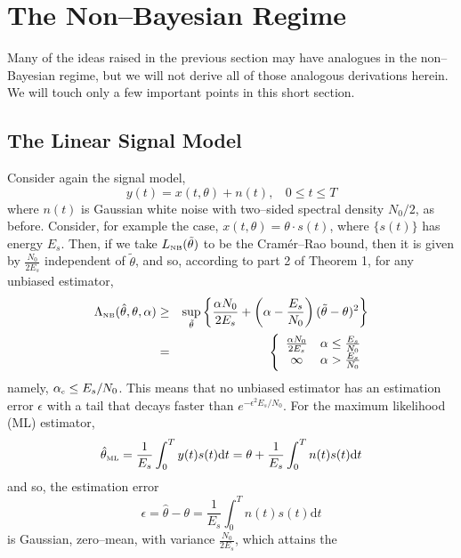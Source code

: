 \documentclass[11pt,epsf]{article}
\newcommand{\ttt}{\tilde{\theta}}
\newcommand{\ct}{\hat{\theta}}
\begin{document}
\section{The Non--Bayesian Regime}

Many of the ideas raised in the previous section may have 
analogues in the non--Bayesian regime, but we will not derive all of
those analogous derivations herein. We will touch only a few important
points in this short section.

\subsection{The Linear Signal Model}

Consider again the signal model,
\begin{equation}
\label{signalinoise}
y(t)=x(t,\theta)+n(t),~~~~0\le t\le T
\end{equation}
where $n(t)$ is Gaussian white noise with two--sided spectral density $N_0/2$,
as before.
Consider, for example the case, $x(t,\theta)=\theta\cdot s(t)$, where
$\{s(t)\}$ has energy $E_s$. Then, if we take $L_{\mbox{\tiny NB}}(\ttt)$ to
be the Cram\'er--Rao bound, then it is 
given by $\frac{N_0}{2E_s}$ independent of $\ttt$, and
so, according to part 2 of Theorem 1, for any unbiased estimator,
\begin{eqnarray}
\Lambda_{\mbox{\tiny NB}}(\ct,\theta,\alpha)&\ge&\sup_{\ttt}\left\{\frac{\alpha
N_0}{2E_s}+\left(\alpha-\frac{E_s}{N_0}\right)(\ttt-\theta)^2\right\}\\
&=&\left\{\begin{array}{cc}
\frac{\alpha N_0}{2E_s} & \alpha \le \frac{E_s}{N_0}\\
\infty & \alpha > \frac{E_s}{N_0}\end{array}\right.
\end{eqnarray}
namely, $\alpha_{\mbox{\tiny c}}\le E_s/N_0$.
This means that no unbiased estimator has an estimation error $\epsilon$
with a tail that decays faster than $e^{-\epsilon^2E_s/N_0}$.
For the maximum likelihood (ML) estimator,
\begin{equation}
\ct_{\mbox{\tiny ML}}=\frac{1}{E_s}\int_0^Ty(t)s(t)\mbox{d}t=
\theta+\frac{1}{E_s}\int_0^Tn(t)s(t)\mbox{d}t
\end{equation}
and so, the estimation error
\begin{equation}
\epsilon= \ct-\theta=\frac{1}{E_s}\int_0^Tn(t)s(t)\mbox{d}t
\end{equation}
is Gaussian, zero--mean, with variance $\frac{N_0}{2E_s}$, which attains the
\end{document}
